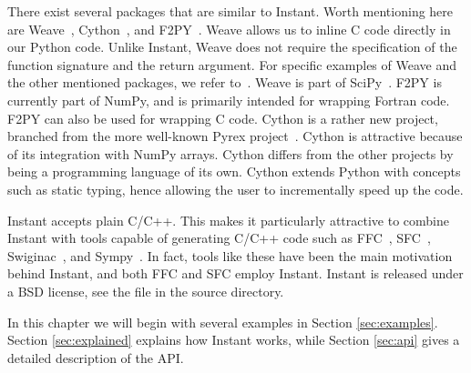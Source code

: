 There exist several packages that are similar to Instant. 
Worth mentioning here are Weave~\cite{www:Weave}, 
Cython~\cite{www:Cython}, and F2PY~\cite{www:F2PY}. 
Weave allows us to inline C code directly in our Python
code. Unlike Instant, Weave does not require the specification of the function
signature and the return argument. For specific examples of Weave and the
other mentioned packages, we refer to~\cite{WilbersLangtangenEtAl2009,www:Weave}. Weave is part of
SciPy~\cite{www:SciPy}. 
F2PY is currently part of NumPy, and is primarily intended
for wrapping Fortran code. F2PY can also be used for wrapping C
code. 
Cython is a rather new project, branched from the more well-known Pyrex
project~\cite{www:Pyrex}. Cython is attractive because of  its integration
with NumPy arrays. Cython differs from the other projects by being a programming
language of its own. Cython extends Python with concepts such as static typing,  
hence allowing the user to incrementally speed up the code.

Instant accepts plain C/C++. This makes it particularly attractive to combine
Instant with tools capable of generating C/C++ code such as FFC~\cite{Logg2007d},
SFC~\cite{SFC}, Swiginac~\cite{www:Swiginac}, and Sympy~\cite{www:Sympy}.  In fact,
tools like these have been the main motivation behind Instant, and both FFC
and SFC employ Instant. Instant is released under a BSD license, see the
file  in the source directory.

In this chapter we will begin with several examples in Section \ref{sec:examples}.  
Section \eqref{sec:explained} explains how Instant works, while 
Section \eqref{sec:api} gives a detailed description of the API. 


